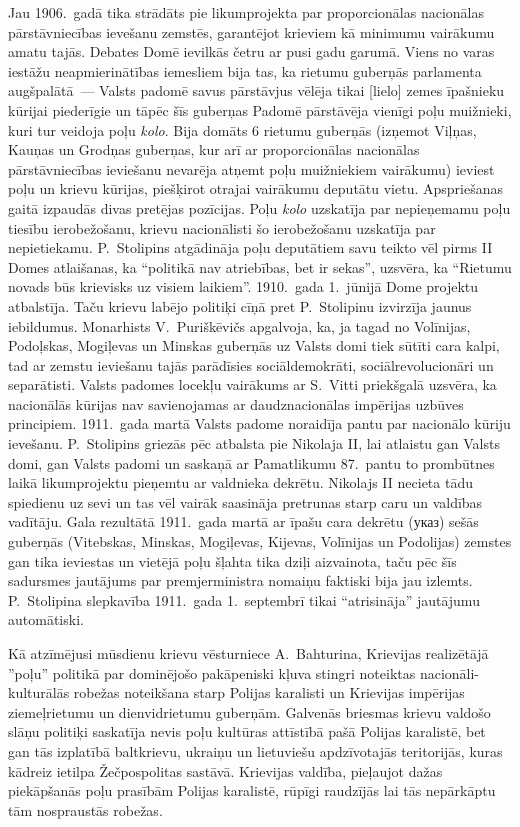 \documentclass[twoside,a5paper,12pt,fleqn,openany]{extbook}
\newcommand{\pltxti}[1]{\textit{\textpolish{#1}}}
\newcommand{\rutxti}[1]{\textrussian{#1}}
\begin{document}
Jau 1906.~gadā tika strādāts pie likumprojekta par proporcionālas nacionālas pārstāvniecības ievešanu zemstēs, garantējot krieviem kā minimumu vairākumu amatu tajās. Debates Domē ievilkās četru ar pusi gadu garumā. Viens no varas iestāžu neapmierinātības iemesliem bija tas, ka rietumu guberņās parlamenta augšpalātā~--- Valsts padomē savus pārstāvjus vēlēja tikai [lielo] zemes īpašnieku kūrijai piederīgie un tāpēc šīs guberņas Padomē pārstāvēja vienīgi poļu muižnieki, kuri tur veidoja poļu \pltxti{kolo}. Bija domāts 6 rietumu guberņās (izņemot Viļņas, Kauņas un Grodņas guberņas, kur arī ar proporcionālas nacionālas pārstāvniecības ieviešanu nevarēja atņemt poļu muižniekiem vairākumu) ieviest poļu un krievu kūrijas, piešķirot otrajai vairākumu deputātu vietu. Apspriešanas gaitā izpaudās divas pretējas pozīcijas. Poļu \pltxti{kolo} uzskatīja par nepieņemamu poļu tiesību ierobežošanu, krievu nacionālisti šo ierobežošanu uzskatīja par nepietiekamu. P.~Stolipins atgādināja poļu deputātiem savu teikto vēl pirms II Domes atlaišanas, ka ``politikā nav atriebības, bet ir sekas'', uzsvēra, ka ``Rietumu novads būs krievisks uz visiem laikiem''. 1910.~gada 1.~jūnijā Dome projektu atbalstīja. Taču krievu labējo politiķi cīņā pret P.~Stolipinu izvirzīja jaunus iebildumus. Monarhists V.~Puriškēvičs apgalvoja, ka, ja tagad no Volīnijas, Podoļskas, Mogiļevas un Minskas guberņās uz Valsts domi tiek sūtīti cara kalpi, tad ar zemstu ieviešanu tajās parādīsies sociāldemokrāti, sociālrevolucionāri un separātisti. Valsts padomes locekļu vairākums ar S.~Vitti priekšgalā uzsvēra, ka nacionālās kūrijas nav savienojamas ar daudznacionālas impērijas uzbūves principiem. 1911.~gada martā Valsts padome noraidīja pantu par nacionālo kūriju ievešanu. P.~Stolipins griezās pēc atbalsta pie Nikolaja II, lai atlaistu gan Valsts domi, gan Valsts padomi un saskaņā ar Pamatlikumu 87.~pantu to prombūtnes laikā likumprojektu pieņemtu ar valdnieka dekrētu. Nikolajs II necieta tādu spiedienu uz sevi un tas vēl vairāk saasināja pretrunas starp caru un valdības vadītāju. Gala rezultātā 1911.~gada martā ar īpašu cara dekrētu (\rutxti{указ}) sešās guberņās (Vitebskas, Minskas, Mogiļevas, Kijevas, Volīnijas un Podolijas) zemstes gan tika ieviestas un vietējā poļu šļahta tika dziļi aizvainota, taču pēc šīs sadursmes jautājums par premjerministra nomaiņu faktiski bija jau izlemts. P.~Stolipina slepkavība 1911.~gada 1.~septembrī tikai ``atrisināja'' jautājumu automātiski.

Kā atzīmējusi mūsdienu krievu vēsturniece A.~Bahturina, Krievijas realizētājā ''poļu'' politikā par dominējošo pakāpeniski kļuva stingri noteiktas nacionāli-kulturālās robežas noteikšana starp Polijas karalisti un Krievijas impērijas ziemeļrietumu un dienvidrietumu guberņām. Galvenās briesmas krievu valdošo slāņu politiķi saskatīja nevis poļu kultūras attīstībā pašā Polijas karalistē, bet gan tās izplatībā baltkrievu, ukraiņu un lietuviešu apdzīvotajās teritorijās, kuras kādreiz ietilpa Žečpospolitas sastāvā. Krievijas valdība, pieļaujot dažas piekāpšanās poļu prasībām Polijas karalistē, rūpīgi raudzījās lai tās nepārkāptu tām nospraustās robežas.
\end{document}
